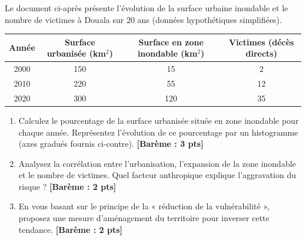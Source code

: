 \documentclass[11pt]{article}
\begin{document}
\begin{exercice}
Le document ci-après présente l'évolution de la surface urbaine inondable et le nombre de victimes à Douala sur 20 ans (données hypothétiques simplifiées).

\begin{tabular}{|c|c|c|c|}
\hline
\textbf{Année} & \textbf{Surface urbanisée (km$^2$)} & \textbf{Surface en zone inondable (km$^2$)} & \textbf{Victimes (décès directs)} \\
\hline
2000 & 150 & 15 & 2 \\
\hline
2010 & 220 & 55 & 12 \\
\hline
2020 & 300 & 120 & 35 \\
\hline
\end{tabular}

\begin{enumerate}
    \item Calculez le pourcentage de la surface urbanisée située en zone inondable pour chaque année. Représentez l'évolution de ce pourcentage par un histogramme (axes gradués fournis ci-contre). \textbf{[Barème : 3 pts]}
    \begin{center}
    \end{center}
    \item Analysez la corrélation entre l'urbanisation, l'expansion de la zone inondable et le nombre de victimes. Quel facteur anthropique explique l'aggravation du risque ? \textbf{[Barème : 2 pts]}
    \item En vous basant sur le principe de la « réduction de la vulnérabilité », proposez une mesure d'aménagement du territoire pour inverser cette tendance. \textbf{[Barème : 2 pts]}
\end{enumerate}
\end{exercice}
\end{document}
